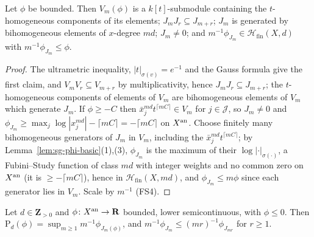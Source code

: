 \begin{lemma}[Properties of $J_m$]\label{lem:sg-Jm-basic}
\leanok
{}
Let $\phi$ be bounded. Then $V_m(\phi)$ is a $k[t]$-submodule containing the $t$-homogeneous components of its elements;
$J_mJ_r\subseteq J_{m+r}$; $J_m$ is generated by bihomogeneous elements of $x$-degree $md$; $J_m\ne0$; and $m^{-1}\phi_{J_m}\in\mathcal H_{\mathrm{fin}}(X,d)$
with $m^{-1}\phi_{J_m}\le\phi$.
\end{lemma}

\begin{proof}
The ultrametric inequality, $|t|_{\sigma(v)}=e^{-1}$ and the Gauss formula give the first claim, and $V_mV_r\subseteq V_{m+r}$ by
multiplicativity, hence $J_mJ_r\subseteq J_{m+r}$; the $t$-homogeneous components of elements of $V_m$ are bihomogeneous elements of
$V_m$ which generate $J_m$. If $\phi\ge-C$ then $\bar x_j^{md}t^{\lceil mC\rceil}\in V_m$ for $j\in\mathcal J$, so $J_m\ne0$ and
$\phi_{J_m}\ge\max_j\log|x_j^{md}|-\lceil mC\rceil=-\lceil mC\rceil$ on $X^{\mathrm{an}}$. Choose finitely many bihomogeneous generators of $J_m$ in $V_m$,
including the $\bar x_j^{md}t^{\lceil mC\rceil}$; by Lemma~\ref{lem:sg-phi-basic}(1),(3), $\phi_{J_m}$ is the maximum of their $\log|\cdot|_{\sigma(\cdot)}$, a
Fubini--Study function of class $md$ with integer weights and no common zero on $X^{\mathrm{an}}$ (it is $\ge-\lceil mC\rceil$), hence in
$\mathcal H_{\mathrm{fin}}(X,md)$, and $\phi_{J_m}\le m\phi$ since each generator lies in $V_m$. Scale by $m^{-1}$ (FS4).
\end{proof}

\begin{proposition}\label{prop:sg-envelope-Jm}
\leanok
{}
Let $d\in\mathbf{Z}_{>0}$ and $\phi\colon X^{\mathrm{an}}\to\mathbf{R}$ bounded, lower semicontinuous, with $\phi\le0$. Then
$\mathrm P_d(\phi)=\sup_{m\ge1}m^{-1}\phi_{J_m(\phi)}$, and $m^{-1}\phi_{J_m}\le(mr)^{-1}\phi_{J_{mr}}$ for $r\ge1$.
\end{proposition}

